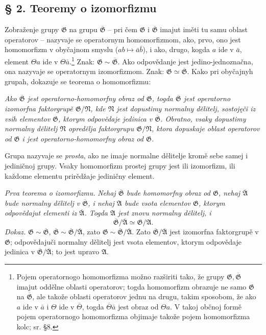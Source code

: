 \documentclass[11pt]{article}
\providecommand{\mG}{\mathfrak{G}}
\providecommand{\mA}{\mathfrak{A}}
\providecommand{\mN}{\mathfrak{N}}
\begin{document}
\setcounter{footnote}{9}

\subsection*{§ 2. Teoremy o izomorfizmu}

Zobraženje grupy $\mG$ na grupu $\overline{\mG}$ -- pri čem $\mG$ i $\overline{\mG}$ imajut iměti tu samu oblast operatorov -- nazyvaje se operatornym homomorfizmom, ako, prvo, ono jest homomorfizm v obyčajnom smyslu ($ab\mapsto \bar a\bar b$), i ako, drugo, kogda $a$ ide v $\bar a$, element $\Theta a$ ide v $\Theta\bar a$.\footnote{Pojem operatornogo homomorfizma možno razširiti tako, že grupy $\mG,\overline{\mG}$ imajut oddělne oblasti operatorov; togda homomorfizm obrazuje ne samo $\mG$ na $\overline{\mG}$, ale takože oblasti operatorov jednu na drugu, takim sposobom, že ako $a$ ide v $\bar a$ i $\Theta$ ide v $\overline\Theta$, togda $\overline\Theta\bar a$ jest obraz od $\Theta a$. V takoj občnoj formě pojem operatornogo homomorfizma objimaje takože pojem homomorfizma kolc; sr. §8.} Znak: $\mG\sim\overline{\mG}$. Ako odpovědanje jest jedino-jednoznačna, ona nazyvaje se operatornym izomorfizmom. Znak: $\mG\simeq\overline{\mG}$. Kako pri obyčajnyh grupah, dokazuje se teorema o homomorfizmu:

\emph{Ako $\overline{\mG}$ jest operatorno-homomorfny obraz od $\mG$, togda $\overline{\mG}$ jest operatorno izomorfna faktorgrupě $\mG/\mN$, kde $\mN$ jest dopustimy normalny dělitelj, sostojęči iz vsih elementov $\mG$, ktorym odpovědaje jedinica v $\overline{\mG}$. Obratno, vsaky dopustimy normalny dělitelj $\mN$ opredělja faktorgrupu $\mG/\mN$, ktora dopuskaje oblast operatorov od $\mG$ i jest operatorno-homomorfny obraz od $\mG$.}

Grupa nazyvaje se \emph{prosta}, ako ne imaje normalne dělitelje kromě sebe samej i jediničnoj grupy. Vsaky homomorfizm prostej grupy jest ili izomorfizm, ili každome elementu prirědžaje jediničny element.

\emph{Prva teorema o izomorfizmu.} \emph{Nehaj $\overline{\mG}$ bude homomorfny obraz od $\mG$, nehaj $\overline{\mA}$ bude normalny dělitelj v $\overline{\mG}$, i nehaj $\mA$ bude vsota elementov $\mG$, ktorym odpovědajut elementi iz $\overline{\mA}$. Togda $\mA$ jest znovu normalny dělitelj, i}
\[
        \overline{\mG}/\overline{\mA}\simeq \mG/\mA. \tag{1}
\]
\emph{Dokaz.} $\mG\sim\overline{\mG}$, $\overline{\mG}\sim\overline{\mG}/\overline{\mA}$, zato $\mG\sim\overline{\mG}/\overline{\mA}$. Zato $\overline{\mG}/\overline{\mA}$ jest izomorfna faktorgrupě v $\mG$; odpovědajuči normalny dělitelj jest vsota elementov, ktorym odpovědaje jedinica v $\overline{\mG}/\overline{\mA}$; to jest upravo $\mA$.
\end{document}

